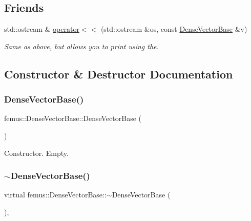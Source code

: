 \subsection*{Friends}
\begin{DoxyCompactItemize}
\item 
std\+::ostream \& \mbox{\hyperlink{classfemus_1_1_dense_vector_base_aeb01fcf21134efd347c12ee61de79ba6}{operator$<$$<$}} (std\+::ostream \&os, const \mbox{\hyperlink{classfemus_1_1_dense_vector_base}{Dense\+Vector\+Base}} \&v)
\begin{DoxyCompactList}\small\item\em Same as above, but allows you to print using the. \end{DoxyCompactList}\end{DoxyCompactItemize}


\subsection{Constructor \& Destructor Documentation}
\mbox{\label{classfemus_1_1_dense_vector_base_ab8222fa8625cb42d2740294a088698f8}} 
\subsubsection{\texorpdfstring{Dense\+Vector\+Base()}{DenseVectorBase()}}
{\footnotesize\ttfamily femus\+::\+Dense\+Vector\+Base\+::\+Dense\+Vector\+Base (\begin{DoxyParamCaption}{ }\end{DoxyParamCaption})\hspace{0.3cm}{\ttfamily [inline]}}



Constructor. Empty. 

\mbox{\label{classfemus_1_1_dense_vector_base_a0c3531c7d5cd8d9b2e5b7d63b97ab555}} 
\subsubsection{\texorpdfstring{$\sim$\+Dense\+Vector\+Base()}{~DenseVectorBase()}}
{\footnotesize\ttfamily virtual femus\+::\+Dense\+Vector\+Base\+::$\sim$\+Dense\+Vector\+Base (\begin{DoxyParamCaption}{ }\end{DoxyParamCaption})\hspace{0.3cm}{\ttfamily [inline]}, {\ttfamily [virtual]}}



